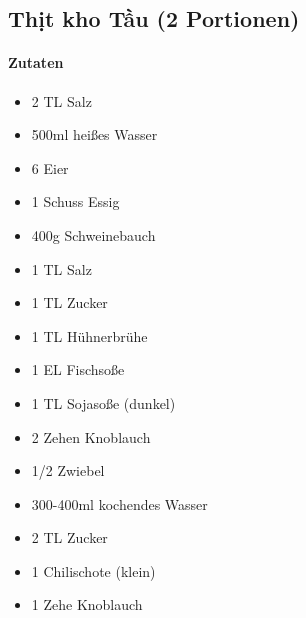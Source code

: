 \newpage
{}
\subsection{Thịt kho Tầu (2 Portionen)}
\paragraph{Zutaten}
\begin{itemize}[noitemsep]
	\item 2 TL Salz
	\item 500ml heißes Wasser
	\item 6 Eier
	\item 1 Schuss Essig
	\item 400g Schweinebauch
	\item 1 TL Salz
	\item 1 TL Zucker
	\item 1 TL Hühnerbrühe
	\item 1 EL Fischsoße
	\item 1 TL Sojasoße (dunkel)
	\item 2 Zehen Knoblauch
	\item 1/2 Zwiebel
	\item 300-400ml kochendes Wasser
	\item 2 TL Zucker
	\item 1 Chilischote (klein)
	\item 1 Zehe Knoblauch
\end{itemize}
